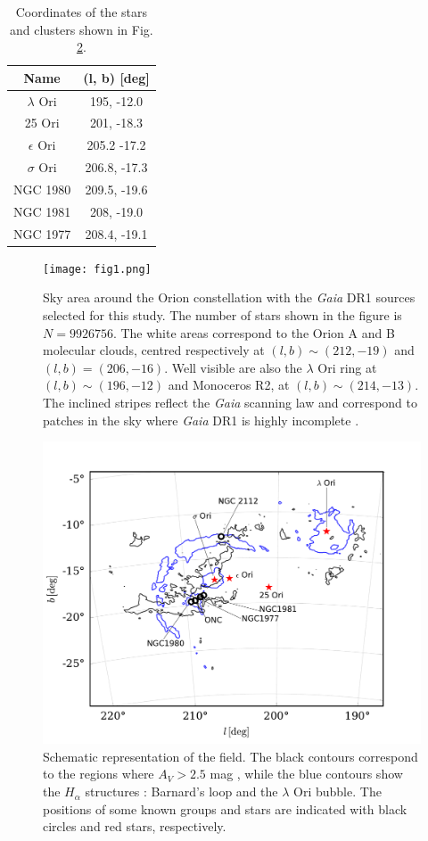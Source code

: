 \documentclass[onecolumn]{aa} %
\begin{document}
\begin{table}
\caption{Coordinates of the stars and clusters shown in Fig. \ref{fig:2}.}
\begin{tabular}{cc}
\hline
Name & (l, b) [deg] \\
\hline
\hline
$\lambda$ Ori  &  195, -12.0 \\
25 Ori & 201, -18.3 \\
$\epsilon$ Ori  &  205.2 -17.2 \\
$\sigma$ Ori & 206.8, -17.3 \\
NGC 1980  &  209.5, -19.6 \\
NGC 1981 &   208, -19.0 \\
NGC 1977  &  208.4, -19.1
\end{tabular}
\label{table:1}
\end{table}

\begin{figure}
\centering
\texttt{[image: fig1.png]}%
\caption{Sky area around the Orion constellation with the \textit{Gaia} DR1 sources selected for this study. The number of stars shown in the figure is $N = 9 926 756$. The white areas correspond to the Orion A and B molecular clouds, centred respectively at $(l, b) \sim (212, -19)$ and $(l, b) = (206, -16)$. Well visible are also the $\lambda$ Ori ring at $(l, b) \sim (196, -12)$ and Monoceros R2, at $(l, b) \sim (214, -13)$. The inclined stripes reflect the \textit{Gaia} scanning law and correspond to patches in the sky where \textit{Gaia} DR1 is highly incomplete \citep[see][]{Brown2016}.
}
\label{fig:1}
\end{figure}
\begin{figure}
\includegraphics[width = \hsize]{fig2.pdf}
\caption{Schematic representation of the field. The black contours correspond to the regions where $A_V > 2.5$ mag \citep{Planck2014}, while the blue contours show the $H_{\alpha}$ structures \citep{Finkbeiner2003}: Barnard's loop and the $\lambda$ Ori bubble. The positions of some known groups and stars are indicated with black circles and red stars, respectively.}
\label{fig:2}
\end{figure}
\end{document}

